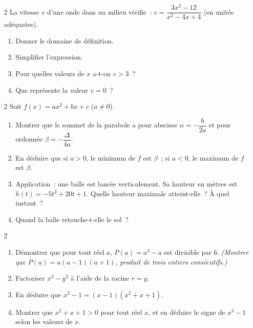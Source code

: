 \begin{probleme}{2}
La vitesse $v$ d'une onde dans un milieu v\'erifie~:
$v = \dfrac{3x^2 - 12}{x^2 - 4x + 4}$ (en unit\'es ad\'equates).
\begin{enumerate}
  \item Donner le domaine de d\'efinition.
  \item Simplifier l'expression.
  \item Pour quelles valeurs de $x$ a-t-on $v > 3$~?
  \item Que repr\'esente la valeur $v = 0$~?
\end{enumerate}
\end{probleme}

\begin{probleme}{2}
Soit $f(x) = ax^2 + bx + c$ ($a \ne 0$).
\begin{enumerate}
  \item Montrer que le sommet de la parabole a pour abscisse $\alpha = -\dfrac{b}{2a}$
        et pour ordonn\'ee $\beta = -\dfrac{\Delta}{4a}$.
  \item En d\'eduire que si $a > 0$, le minimum de $f$ est $\beta$~;
        si $a < 0$, le maximum de $f$ est $\beta$.
  \item Application~: une balle est lanc\'ee verticalement. Sa hauteur
        en m\`etres est $h(t) = -5t^2 + 20t + 1$.
        Quelle hauteur maximale atteint-elle~? \`A quel instant~?
  \item Quand la balle retouche-t-elle le sol~?
\end{enumerate}
\end{probleme}

\begin{probleme}{2}
\begin{enumerate}
  \item D\'emontrer que pour tout r\'eel $a$, $P(a) = a^3 - a$ est divisible par $6$.
        \emph{(Montrer que $P(a) = a(a-1)(a+1)$, produit de trois entiers cons\'ecutifs.)}
  \item Factoriser $x^3 - y^3$ \`a l'aide de la racine $r=y$.
  \item En d\'eduire que $x^3 - 1 = (x-1)(x^2+x+1)$.
  \item Montrer que $x^2+x+1 > 0$ pour tout r\'eel $x$, et en d\'eduire
        le signe de $x^3 - 1$ selon les valeurs de $x$.
\end{enumerate}
\end{probleme}

